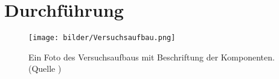 \section{Durchführung}
\label{sec:Durchfuehrung}

\begin{figure}
    \centering
    \texttt{[image: bilder/Versuchsaufbau.png]}
    \caption{Ein Foto des Versuchsaufbaus mit Beschriftung der Komponenten. (Quelle \cite{Anleitung})}
    \label{fig:Versuchsaufbau}
\end{figure}